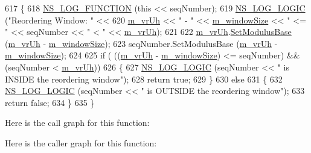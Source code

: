 \begin{DoxyCode}
617 \{
618   \hyperlink{log-macros-disabled_8h_a90b90d5bad1f39cb1b64923ea94c0761}{NS\_LOG\_FUNCTION} (\textcolor{keyword}{this} << seqNumber);
619   \hyperlink{group__logging_ga88acd260151caf2db9c0fc84997f45ce}{NS\_LOG\_LOGIC} (\textcolor{stringliteral}{"Reordering Window: "} <<
620                 \hyperlink{classns3_1_1LteRlcUm_aac5ed94d69ff8dbcd7bda1cbe0d3f2f4}{m\_vrUh} << \textcolor{stringliteral}{" - "} << \hyperlink{classns3_1_1LteRlcUm_aa26c2e759abe7309fa1daf32ab7bfa0a}{m\_windowSize} << \textcolor{stringliteral}{" <= "} << seqNumber << \textcolor{stringliteral}{" < "} << 
      \hyperlink{classns3_1_1LteRlcUm_aac5ed94d69ff8dbcd7bda1cbe0d3f2f4}{m\_vrUh});
621 
622   \hyperlink{classns3_1_1LteRlcUm_aac5ed94d69ff8dbcd7bda1cbe0d3f2f4}{m\_vrUh}.\hyperlink{classns3_1_1SequenceNumber10_afd6d1e35503ecdab3a9b4b3e8c77e47c}{SetModulusBase} (\hyperlink{classns3_1_1LteRlcUm_aac5ed94d69ff8dbcd7bda1cbe0d3f2f4}{m\_vrUh} - \hyperlink{classns3_1_1LteRlcUm_aa26c2e759abe7309fa1daf32ab7bfa0a}{m\_windowSize});
623   seqNumber.SetModulusBase (\hyperlink{classns3_1_1LteRlcUm_aac5ed94d69ff8dbcd7bda1cbe0d3f2f4}{m\_vrUh} - \hyperlink{classns3_1_1LteRlcUm_aa26c2e759abe7309fa1daf32ab7bfa0a}{m\_windowSize});
624 
625   \textcolor{keywordflow}{if} ( ((\hyperlink{classns3_1_1LteRlcUm_aac5ed94d69ff8dbcd7bda1cbe0d3f2f4}{m\_vrUh} - \hyperlink{classns3_1_1LteRlcUm_aa26c2e759abe7309fa1daf32ab7bfa0a}{m\_windowSize}) <= seqNumber) && (seqNumber < 
      \hyperlink{classns3_1_1LteRlcUm_aac5ed94d69ff8dbcd7bda1cbe0d3f2f4}{m\_vrUh}))
626     \{
627       \hyperlink{group__logging_ga88acd260151caf2db9c0fc84997f45ce}{NS\_LOG\_LOGIC} (seqNumber << \textcolor{stringliteral}{" is INSIDE the reordering window"});
628       \textcolor{keywordflow}{return} \textcolor{keyword}{true};
629     \}
630   \textcolor{keywordflow}{else}
631     \{
632       \hyperlink{group__logging_ga88acd260151caf2db9c0fc84997f45ce}{NS\_LOG\_LOGIC} (seqNumber << \textcolor{stringliteral}{" is OUTSIDE the reordering window"});
633       \textcolor{keywordflow}{return} \textcolor{keyword}{false};
634     \}
635 \}
\end{DoxyCode}


Here is the call graph for this function\+:




Here is the caller graph for this function\+:


